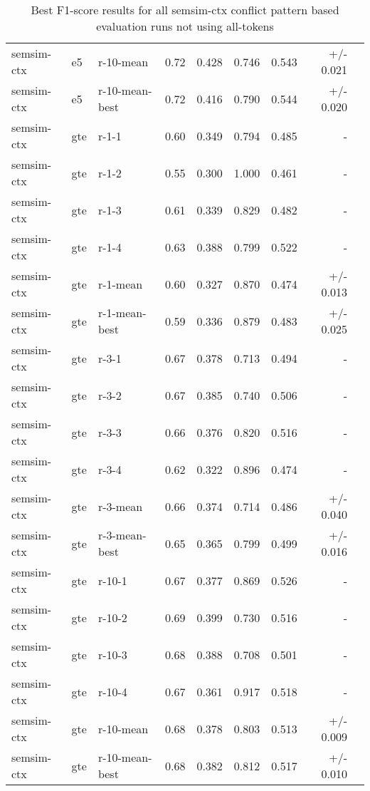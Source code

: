 \begin{table}[H]
\begin{tabular}{lllrrrrrr}
semsim-ctx & e5 & r-10-mean & 0.72 & 0.428 & 0.746 & 0.543 & +/- 0.021 \\
semsim-ctx & e5 & r-10-mean-best & 0.72 & 0.416 & 0.790 & 0.544 & +/- 0.020 \\
\hline
semsim-ctx & gte & r-1-1 & 0.60 & 0.349 & 0.794 & 0.485 & - \\
semsim-ctx & gte & r-1-2 & 0.55 & 0.300 & 1.000 & 0.461 & - \\
semsim-ctx & gte & r-1-3 & 0.61 & 0.339 & 0.829 & 0.482 & - \\
semsim-ctx & gte & r-1-4 & 0.63 & 0.388 & 0.799 & 0.522 & - \\
semsim-ctx & gte & r-1-mean & 0.60 & 0.327 & 0.870 & 0.474 & +/- 0.013 \\
semsim-ctx & gte & r-1-mean-best & 0.59 & 0.336 & 0.879 & 0.483 & +/- 0.025 \\
\hline
semsim-ctx & gte & r-3-1 & 0.67 & 0.378 & 0.713 & 0.494 & - \\
semsim-ctx & gte & r-3-2 & 0.67 & 0.385 & 0.740 & 0.506 & - \\
semsim-ctx & gte & r-3-3 & 0.66 & 0.376 & 0.820 & 0.516 & - \\
semsim-ctx & gte & r-3-4 & 0.62 & 0.322 & 0.896 & 0.474 & - \\
semsim-ctx & gte & r-3-mean & 0.66 & 0.374 & 0.714 & 0.486 & +/- 0.040 \\
semsim-ctx & gte & r-3-mean-best & 0.65 & 0.365 & 0.799 & 0.499 & +/- 0.016 \\
\hline
semsim-ctx & gte & r-10-1 & 0.67 & 0.377 & 0.869 & 0.526 & - \\
semsim-ctx & gte & r-10-2 & 0.69 & 0.399 & 0.730 & 0.516 & - \\
semsim-ctx & gte & r-10-3 & 0.68 & 0.388 & 0.708 & 0.501 & - \\
semsim-ctx & gte & r-10-4 & 0.67 & 0.361 & 0.917 & 0.518 & - \\
semsim-ctx & gte & r-10-mean & 0.68 & 0.378 & 0.803 & 0.513 & +/- 0.009 \\
semsim-ctx & gte & r-10-mean-best & 0.68 & 0.382 & 0.812 & 0.517 & +/- 0.010 \\
\bottomrule
\end{tabular}
\caption{Best F1-score results for all semsim-ctx conflict pattern based evaluation runs not using all-tokens}
\label{tab:quant-results-semsim-ctx}
\end{table}


